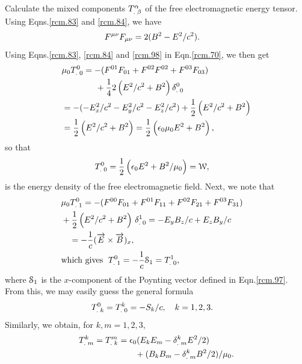 \exmnp Calculate the mixed components ${{T}^{{\alpha}}_{.\;{\beta}}}$
of the free  electromagnetic energy tensor.
\soln  Using Eqns.\eqref{rcm.83} and \eqref{rcm.84}, we
have
\begin{align}\label{rcm.117}
F^ {{\mu}{\nu}} F_{{\mu}{\nu}}& =2(B^2-E^2/c^2).
\end{align}
Using Eqns.\eqref{rcm.83}, \eqref{rcm.84} and
\eqref{rcm.98} in  Eqn.\eqref{rcm.70}, we then get
\begin{align*}
&\mu_0{{T}^{0}_{.\;0}}
=-(F^{01}F_{01}+F^{02}F^{02}+F^{03}F_{03})\notag\\
&\qquad\qquad+\frac{1}{4}2\left(E^2/c^2+B^2\right)
{{{\delta}}^{0}_{.\;0 }} \notag\\
& =-(-E_x^2/c^2-E_y^2/c^2-E_z^2/c^2)+\frac{1}{2}
\left(E^2/c^2+B^2\right)\notag\\
& =\frac{1}{2}\left(E^2/c^2+B^2\right)
=\frac{1}{2}\left(\epsilon_0\mu_0 E^2+B^2\right),
\end{align*}
so that
\begin{align}\label{rcm.118}
{\ensuremath{{T}^{0}_{.\;0}}}&=\frac{1}{2}\left(\epsilon_0
E^2+B^2/\mu_0\right)=\EuScript{W},
\end{align}
is the energy density of the free electromagnetic field.  
Next, we note that
\begin{align}
&\nnnt\nnnt   \muo\mtud{T}{0}{1}
=-(F^{00}F_{01}+F^{01}F_{11}+F^{02}F_{21}
+F^{03}F_{31}) \notag\\&\nnnt\nnnt +\frac{1}{2}\left(E^2/c^2
+B^2\right)
\,\mtud{\gkd}{1}{0}=-E_y B_z/c+E_z
B_y/c\notag\\&=-\frac{1}{c}(\vec{E}\times
\vec{B})_x,\notag\\
&\nnnt\nnnt\text{which gives
}\;\mtud{T}{0}{1}=-\frac{1}{c}\EuScript{S}_1
=\mtud{T}{1}{0},
\end{align}
where $\EuScript{S}_1$ is the $x$-component of the Poynting 
vector  defined in Eqn.\eqref{rcm.97}. From this, we may 
easily guess the general formula
\begin{align}\label{rcm.120}
{\ensuremath{{T}^{0}_{.\;k}}}&= {{T}^{k}_{.\;0}} = -S_k/c, \quad
k=1,2,3.
\end{align}
Similarly,  we obtain, for $k,m=1,2,3$,
\begin{align}\label{rcm.121}
{\ensuremath{{T}^{k}_{.\;m}}}={{T}^{m}_{.\;k}}
&=\epsilon_0(E_k E_m 
-{{\delta}^{k}_{.\;m}}E^2/2)\notag\\&\qquad+(B_k
B_m -{{\delta}^{k}_{.\;m}} B^2/2)/\mu_0.
\end{align}\ebxns

